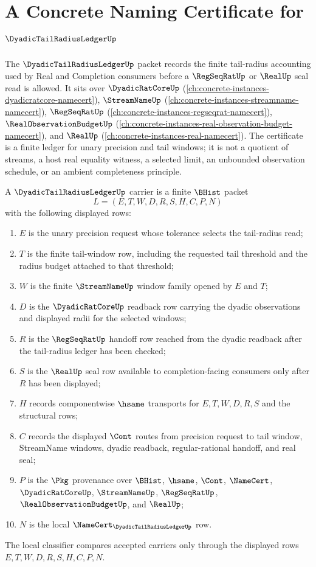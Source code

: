 \chapter{A Concrete Naming Certificate for $\DyadicTailRadiusLedgerUp$}
\label{ch:concrete-instances-dyadic-tail-radius-ledger-namecert}

The $\DyadicTailRadiusLedgerUp$ packet records the finite tail-radius accounting used by Real and Completion consumers before a $\RegSeqRatUp$ or $\RealUp$ seal read is allowed. It sits over $\DyadicRatCoreUp$ (\autoref{ch:concrete-instances-dyadicratcore-namecert}), $\StreamNameUp$ (\autoref{ch:concrete-instances-streamname-namecert}), $\RegSeqRatUp$ (\autoref{ch:concrete-instances-regseqrat-namecert}), $\RealObservationBudgetUp$ (\autoref{ch:concrete-instances-real-observation-budget-namecert}), and $\RealUp$ (\autoref{ch:concrete-instances-real-namecert}). The certificate is a finite ledger for unary precision and tail windows; it is not a quotient of streams, a host real equality witness, a selected limit, an unbounded observation schedule, or an ambient completeness principle.

\begin{definition}
\label{def:dyadic-tail-radius-ledger-carrier}
A $\DyadicTailRadiusLedgerUp$ carrier is a finite $\BHist$ packet
$$
L=(E,T,W,D,R,S,H,C,P,N)
$$
with the following displayed rows:
\begin{enumerate}
\item $E$ is the unary precision request whose tolerance selects the tail-radius read;
\item $T$ is the finite tail-window row, including the requested tail threshold and the radius budget attached to that threshold;
\item $W$ is the finite $\StreamNameUp$ window family opened by $E$ and $T$;
\item $D$ is the $\DyadicRatCoreUp$ readback row carrying the dyadic observations and displayed radii for the selected windows;
\item $R$ is the $\RegSeqRatUp$ handoff row reached from the dyadic readback after the tail-radius ledger has been checked;
\item $S$ is the $\RealUp$ seal row available to completion-facing consumers only after $R$ has been displayed;
\item $H$ records componentwise $\hsame$ transports for $E,T,W,D,R,S$ and the structural rows;
\item $C$ records the displayed $\Cont$ routes from precision request to tail window, StreamName windows, dyadic readback, regular-rational handoff, and real seal;
\item $P$ is the $\Pkg$ provenance over $\BHist$, $\hsame$, $\Cont$, $\NameCert$, $\DyadicRatCoreUp$, $\StreamNameUp$, $\RegSeqRatUp$, $\RealObservationBudgetUp$, and $\RealUp$;
\item $N$ is the local $\NameCert_{\DyadicTailRadiusLedgerUp}$ row.
\end{enumerate}
The local classifier compares accepted carriers only through the displayed rows $E,T,W,D,R,S,H,C,P,N$.
\end{definition}

